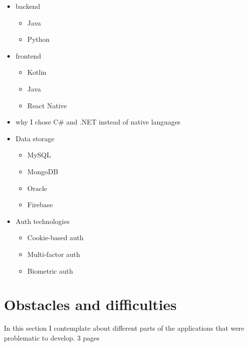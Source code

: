 \begin{itemize}
	\item backend
	\begin{itemize}
		\item Java
		\item Python
	\end{itemize}
	\item frontend
	\begin{itemize}
		\item Kotlin
		\item Java
		\item React Native
	\end{itemize}
	\item why I chose C\# and .NET instead of native languages
	\item Data storage
	\begin{itemize}
		\item MySQL
		\item MongoDB
		\item Oracle
		\item Firebase
	\end{itemize}
	\item Auth technologies
	\begin{itemize}
		\item Cookie-based auth
		\item Multi-factor auth
		\item Biometric auth
	\end{itemize}

\end{itemize}

\section{Obstacles and difficulties}
In this section I contemplate about different parts of the applications that were problematic to develop. 3 pages

\begin{itemize}
	\item HTTPS on Android
	\begin{itemize}
		\item difficulties connecting to the server on HTTPS
		\item certificate issues
	\end{itemize}
	\item Windows CNG not being implemented in Mono
	\begin{itemize}
		\item switching to the open-source ECDH implementation
	\end{itemize}
	\item accessing resources within the Android secure storage (icons, config files etc.)
\end{itemize}


